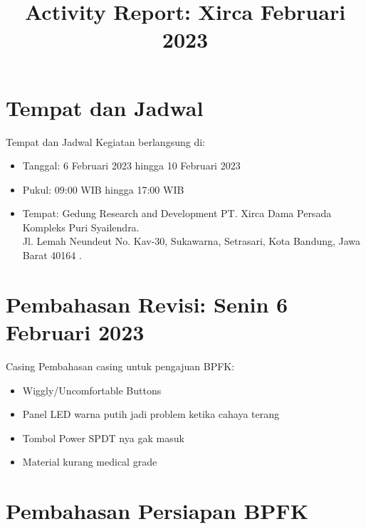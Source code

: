 \documentclass[table,dvipsnames]{beamer}
\title[Xirca042022]{Activity Report: Xirca Februari 2023}
\author{}
\institute[VibrasticLab : \ccbysa]{
    Achmadi ST MT
}
\date{}
\begin{document}
    \begin{frame}
        \titlepage
    \end{frame}

    \section{Tempat dan Jadwal}
    \begin{frame}
        \begin{exampleblock}{Tempat dan Jadwal}
            Kegiatan berlangsung di:
            \begin{itemize}
                \item Tanggal: 6 Februari 2023 hingga 10 Februari 2023
                \item Pukul: 09:00 WIB hingga 17:00 WIB
                \item Tempat: Gedung Research and Development PT. Xirca Dama Persada\\
                Kompleks Puri Syailendra.\\
                Jl. Lemah Neundeut No. Kav-30, Sukawarna, Setrasari, Kota Bandung, Jawa Barat 40164 .
            \end{itemize}
        \end{exampleblock}
    \end{frame}

    \section{Pembahasan Revisi: Senin 6 Februari 2023}
    \begin{exampleblock}{Casing}
        Pembahasan casing untuk pengajuan BPFK:
        \begin{itemize}
            \item Wiggly/Uncomfortable Buttons
            \item Panel LED warna putih jadi problem ketika cahaya terang
            \item Tombol Power SPDT nya gak masuk
            \item Material kurang medical grade
        \end{itemize}
    \end{exampleblock}

    \section{Pembahasan Persiapan BPFK}
    \begin{exampleblock}{}

    \end{exampleblock}
\end{document}

